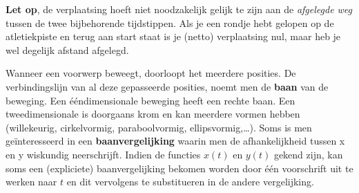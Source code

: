 \documentclass{ximera}
\begin{document}
\textbf{Let op}, de verplaatsing hoeft niet noodzakelijk gelijk te zijn aan de \emph{afgelegde weg} tussen de twee bijbehorende tijdstippen. 
Als je een rondje hebt gelopen op de atletiekpiste en terug aan start staat is je (netto) verplaatsing nul, maar heb je wel degelijk afstand afgelegd.

Wanneer een voorwerp beweegt, doorloopt het meerdere posities. 
De verbindingslijn van al deze gepasseerde posities, noemt men de \textbf{baan} van de beweging. 
Een ééndimensionale beweging heeft een rechte baan. 
Een tweedimensionale is doorgaans krom en kan meerdere vormen hebben (willekeurig, cirkelvormig, paraboolvormig, ellipsvormig,\ldots). 
Soms is men geïnteresseerd in een \textbf{baanvergelijking} waarin men de afhankelijkheid tussen x en y wiskundig neerschrijft.
Indien de functies \(x(t)\) en \(y(t)\) gekend zijn, kan soms een (expliciete) baanvergelijking bekomen worden door één voorschrift uit te werken naar \(t\) en dit vervolgens te substitueren in de andere vergelijking.


\begin{image}[0.5\textwidth]

\end{image}



\end{document}

